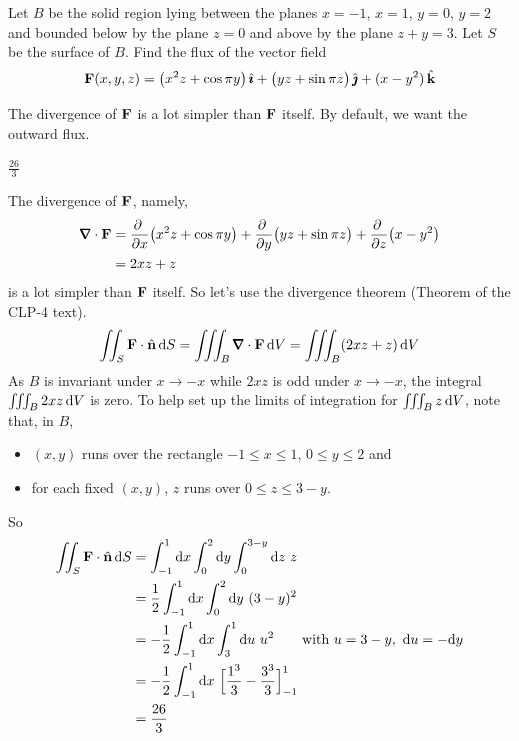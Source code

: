 \begin{question}[M317 2006A] %
Let $B$ be the solid region lying between the planes $x=-1$,
$x=1$, $y=0$, $y=2$ and bounded below by the plane $z=0$ and above 
by the plane $z+y=3$. Let $S$ be the surface of $B$. Find the flux 
of the vector field
\begin{equation*}
\mathbf{F}(x,y,z) =  \big(x^2 z +\cos \pi y\big)\,\hat{\pmb{\imath}}
             +\big(yz +\sin \pi z\big)\,\hat{\pmb{\jmath}}
             +(x-y^2)\,\hat{\mathbf{k}}
\end{equation*}
\end{question}

\begin{hint} 
The divergence of $\mathbf{F}$ is a lot simpler than $\mathbf{F}$ itself.
By default, we want the outward flux.
\end{hint}

\begin{answer} 
$\frac{26}{3}$
\end{answer}

\begin{solution}
The divergence of $\mathbf{F}$, namely,
\begin{align*}
\vnabla\cdot\vF &= 
    \pdiff{}{x}\big(x^2 z +\cos \pi y\big)
     +\pdiff{}{y}\big(yz +\sin \pi z\big)
     +\pdiff{}{z}\big(x-y^2\big) \\
  &=2xz +z
\end{align*}
is a lot simpler than $\mathbf{F}$ itself. So let's use the divergence theorem
(Theorem  of the CLP-4 text). 
\begin{align*}
\dblInt_S \vF \cdot \hn\,\dee{S}
=\tripInt_B \vnabla\cdot\vF\,\dee{V}
=\tripInt_B (2xz+z)\,\dee{V}
\end{align*}
As $B$ is invariant under $x\rightarrow-x$ while $2xz$ is odd under 
$x\rightarrow-x$, the integral $\iiint_B 2xz\,\mathrm{d}V$ is zero.
To help set up the limits of integration for $\iiint_B z\,\mathrm{d}V$,
note that, in $B$,
\begin{itemize}\itemsep1pt \parskip0pt  %
\item[$\circ$]
$(x,y)$ runs over the rectangle $-1\le x\le 1$, $0\le y\le 2$ and
\item[$\circ$]
for each fixed $(x,y)$, $z$ runs over $0\le z\le 3-y$.
\end{itemize}
So
\begin{align*}
\dblInt_S \vF \cdot \hn\,\dee{S}
&= \int_{-1}^1\dee{x}\int_0^2\dee{y}\int_0^{3-y}\dee{z}\ z \\
&= \frac{1}{2}\int_{-1}^1\dee{x}\int_0^2\dee{y}\ (3-y)^2 \\
&=-\frac{1}{2}\int_{-1}^1\dee{x}\int_3^1\dee{u}\ u^2 \qquad
\text{with } u = 3-y,\ \dee{u}=-\dee{y} \\
&=-\frac{1}{2}\int_{-1}^1\dee{x}\ 
       \Big[\frac{1^3}{3} - \frac{3^3}{3}\Big]_{-1}^1\\
&=\frac{26}{3}
\end{align*}

\end{solution}

